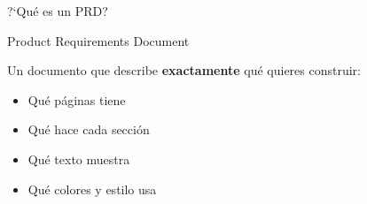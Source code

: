 \documentclass[aspectratio=169]{beamer}
\begin{document}
\begin{frame}{?`Qu\'e es un PRD?}
\vspace{0.3cm}

{\large\color{accentlight} Product Requirements Document}

\vspace{0.4cm}

Un documento que describe \textbf{exactamente} qu\'e quieres construir:
\begin{itemize}
\setlength\itemsep{0.4em}
\item Qu\'e p\'aginas tiene
\item Qu\'e hace cada secci\'on
\item Qu\'e texto muestra
\item Qu\'e colores y estilo usa
\end{itemize}

\vspace{0.5cm}

\begin{center}
\end{center}
\end{frame}
\end{document}
